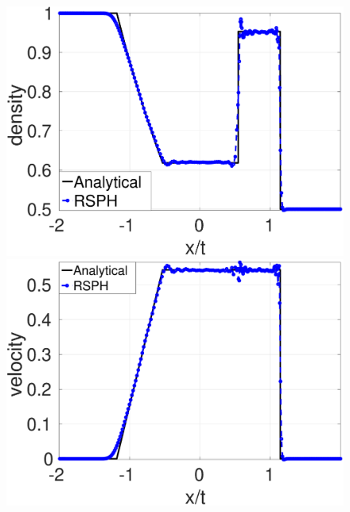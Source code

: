 \begin{figure}[H]
    \centering
    \begin{minipage}{.495\textwidth}
        \centering
        \includegraphics[width=0.99 \textwidth]{Chapter-4/Figures/GSPH-Sod/GRod-RCM-rho}
    \end{minipage}%
    \begin{minipage}{.495 \textwidth}
        \centering
        \includegraphics[width=0.99 \textwidth]{Chapter-4/Figures/GSPH-Sod/GRod-RCM-v}
    \end{minipage}%
    \\
    \begin{minipage}{.495\textwidth}
        \centering

\end{minipage}
\end{figure}
